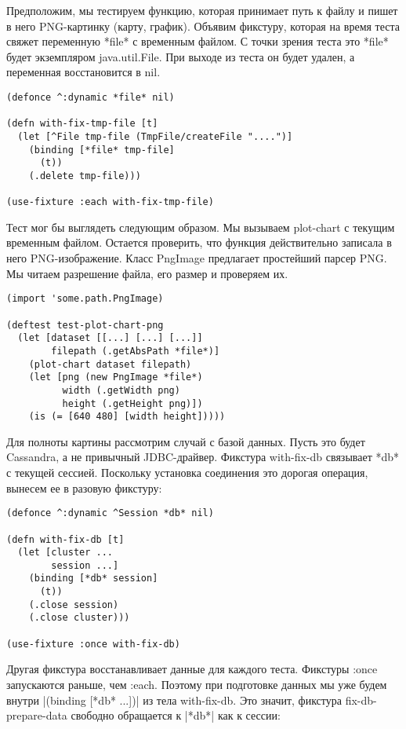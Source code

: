 Предположим, мы тестируем функцию, которая принимает путь к файлу и пишет в него
PNG-картинку (карту, график). Объявим фикстуру, которая на время теста свяжет
переменную *file* с временным файлом. С точки зрения теста это *file* будет
экземпляром java.util.File. При выходе из теста он будет удален, а переменная
восстановится в nil.

\begin{verbatim}
(defonce ^:dynamic *file* nil)

(defn with-fix-tmp-file [t]
  (let [^File tmp-file (TmpFile/createFile "....")]
    (binding [*file* tmp-file]
      (t))
    (.delete tmp-file)))

(use-fixture :each with-fix-tmp-file)
\end{verbatim}

Тест мог бы выглядеть следующим образом. Мы вызываем plot-chart с текущим
временным файлом. Остается проверить, что функция действительно записала в него
PNG-изображение. Класс PngImage предлагает простейший парсер PNG. Мы читаем
разрешение файла, его размер и проверяем их.

\begin{verbatim}
(import 'some.path.PngImage)

(deftest test-plot-chart-png
  (let [dataset [[...] [...] [...]]
        filepath (.getAbsPath *file*)]
    (plot-chart dataset filepath)
    (let [png (new PngImage *file*)
          width (.getWidth png)
          height (.getHeight png)])
    (is (= [640 480] [width height]))))
\end{verbatim}

Для полноты картины рассмотрим случай с базой данных. Пусть это будет Cassandra,
а не привычный JDBC-драйвер. Фикстура with-fix-db связывает *db* с текущей
сессией. Поскольку установка соединения это дорогая операция, вынесем ее в
разовую фикстуру:

\begin{verbatim}
(defonce ^:dynamic ^Session *db* nil)

(defn with-fix-db [t]
  (let [cluster ...
        session ...]
    (binding [*db* session]
      (t))
    (.close session)
    (.close cluster)))

(use-fixture :once with-fix-db)
\end{verbatim}

Другая фикстура восстанавливает данные для каждого теста. Фикстуры :once
запускаются раньше, чем :each. Поэтому при подготовке данных мы уже будем внутри
\spverb|(binding [*db* ...])| из тела with-fix-db. Это значит, фикстура
fix-db-prepare-data свободно обращается к \spverb|*db*| как к сессии:

